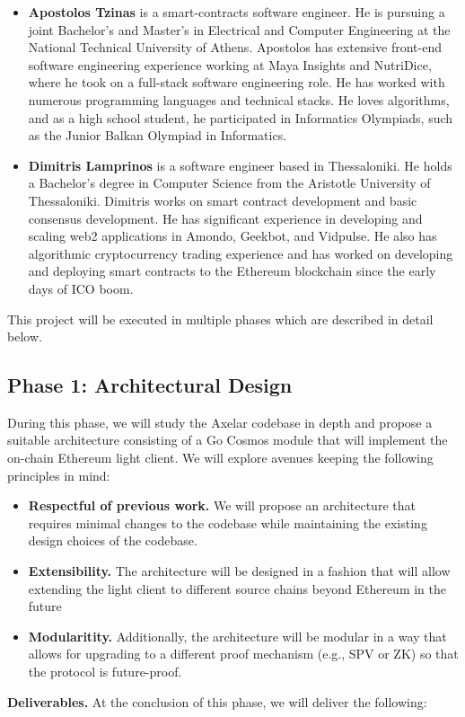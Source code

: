 \begin{itemize}
  \item \textbf{Apostolos Tzinas} is a smart-contracts software engineer. He is pursuing a joint Bachelor’s and Master’s in Electrical and Computer Engineering at the National Technical University of Athens. Apostolos has extensive front-end software engineering experience working at Maya Insights and NutriDice, where he took on a full-stack software engineering role. He has worked with numerous programming languages and technical stacks. He loves algorithms, and as a high school student, he participated in Informatics Olympiads, such as the Junior Balkan Olympiad in Informatics. 
  \item \textbf{Dimitris Lamprinos} is a software engineer based in Thessaloniki. He holds a Bachelor’s degree in Computer Science from the Aristotle University of Thessaloniki. Dimitris works on smart contract development and basic consensus development. He has significant experience in developing and scaling web2 applications in Amondo, Geekbot, and Vidpulse. He also has algorithmic cryptocurrency trading experience and has worked on developing and deploying smart contracts to the Ethereum
    blockchain since the early days of ICO boom.
\end{itemize}

This project will be executed in multiple phases which are described in detail below.

\subsection{Phase 1: Architectural Design}
During this phase, we will study the Axelar codebase in depth and propose a suitable architecture consisting of a Go Cosmos module that will implement the on-chain Ethereum light client.
We will explore avenues keeping the following principles in mind: 
\begin{itemize}
  \item \textbf{Respectful of previous work.} We will propose an architecture that requires minimal changes to the codebase while maintaining the existing design choices of the codebase.
  \item \textbf{Extensibility.} The architecture will be designed in a fashion that will allow extending the light client to different source chains beyond Ethereum in the future  
  \item \textbf{Modularitity.} Additionally, the architecture will be modular in a way that allows for upgrading to a different proof mechanism (e.g., SPV or ZK) so that the protocol is future-proof.
\end{itemize}
\noindent
\textbf{Deliverables.} At the conclusion of this phase, we will deliver the following:

